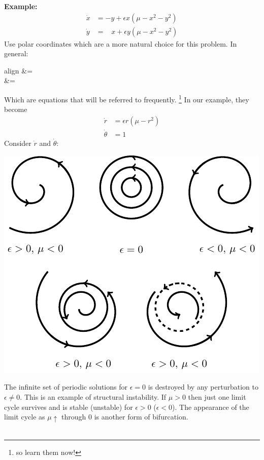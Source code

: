 \documentclass{article}
\newcommand{\example}{\textbf{Example:}}                    %
\begin{document}
\example\   
\begin{align*}
\dot{x} &= -y + \epsilon x (\mu - x^2 - y^2) \\
\dot{y} &= \;\;\; x + \epsilon y (\mu - x^2 - y^2)
\end{align*}
Use polar coordinates which are a more natural choice for this problem.
In general:
\begin{empheq}[box=\fbox]{align}
 &=  \nonumber \\
\dot{\theta} &=  \nonumber
\end{empheq}
Which are equations that will be referred to frequently. \footnote{so learn them now!}
In our example, they become
\begin{align*}
\dot{r} &= \epsilon r (\mu - r^2) \\
\dot{\theta} &= 1
\end{align*}
Consider $\dot{r}$ and $\dot{\theta}$:
\begin{center}
\includegraphics{Fig4.pdf}
\end{center}
\noindent
The infinite set of periodic solutions for $\epsilon = 0$ is destroyed by any 
perturbation to $\epsilon \neq 0$. This is an example of structural instability.
If $\mu > 0$ then just one limit cycle survives and is stable (unstable) for 
$\epsilon >0$ ($\epsilon < 0$). The appearance of the limit cycle as $\mu \uparrow$ 
through $0$ is another form of bifurcation.
\\
\\
\end{document}
